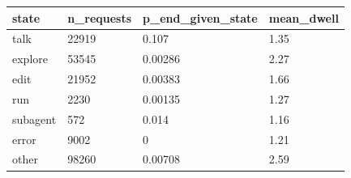 \begin{tabular}{llll}
\toprule
state & n\_requests & p\_end\_given\_state & mean\_dwell \\
\midrule
talk & 22919 & 0.107 & 1.35 \\
explore & 53545 & 0.00286 & 2.27 \\
edit & 21952 & 0.00383 & 1.66 \\
run & 2230 & 0.00135 & 1.27 \\
subagent & 572 & 0.014 & 1.16 \\
error & 9002 & 0 & 1.21 \\
other & 98260 & 0.00708 & 2.59 \\
\bottomrule
\end{tabular}